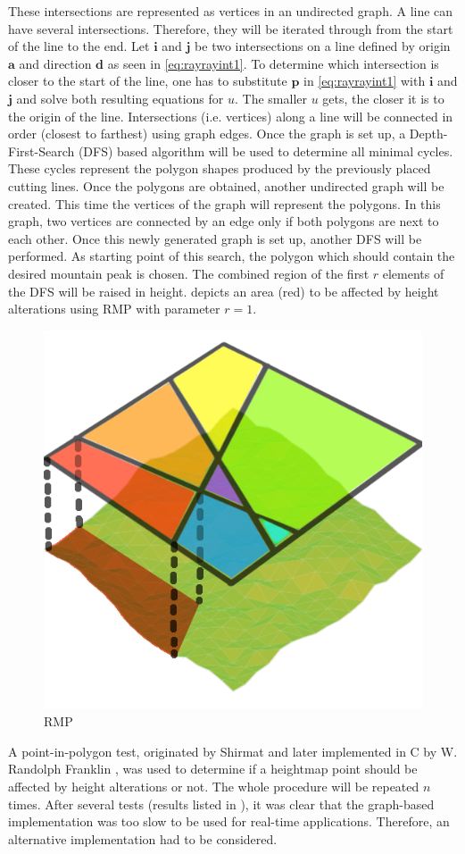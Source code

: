 \documentclass[11pt,a4paper,twoside,openright]{report}
\begin{document}
These intersections are represented as vertices in an undirected graph. A line can have several intersections. Therefore, they will be iterated through from the start of the line to the end. Let $\mathbf{i}$ and $\mathbf{j}$ be two intersections on a line defined by origin $\mathbf{a}$ and direction $\mathbf{d}$ as seen in \eqref{eq:rayrayint1}. To determine which intersection is closer to the start of the line, one has to substitute $\mathbf{p}$ in \eqref{eq:rayrayint1} with $\mathbf{i}$ and $\mathbf{j}$ and solve both resulting equations for $u$. The smaller $u$ gets, the closer it is to the origin of the line. Intersections (i.e. vertices) along a line will be connected in order (closest to farthest) using graph edges. Once the graph is set up, a Depth-First-Search (DFS) based algorithm will be used to determine all minimal cycles. These cycles represent the polygon shapes produced by the previously placed cutting lines. Once the polygons are obtained, another undirected graph will be created. This time the vertices of the graph will represent the polygons. In this graph, two vertices are connected by an edge only if both polygons are next to each other. Once this newly generated graph is set up, another DFS will be performed. As starting point of this search, the polygon which should contain the desired mountain peak is chosen. The combined region of the first $r$ elements of the DFS will be raised in height.  depicts an area (red) to be affected by height alterations using RMP with parameter $r = 1$.

\begin{figure}[h]
\centering
\includegraphics[width=0.25\linewidth]{rmp_overlay1.png}
\caption{RMP}\label{fig:rmpoverlay}
\end{figure}

\noindent A point-in-polygon test, originated by Shirmat \cite{Shimrat:1962:APP:368637.368653} and later implemented in C by W. Randolph Franklin \cite{Franklin:1994}, was used to determine if a heightmap point should be affected by height alterations or not. The whole procedure will be repeated $n$ times. After several tests (results listed in ), it was clear that the graph-based implementation was too slow to be used for real-time applications. Therefore, an alternative implementation had to be considered.
\end{document}
